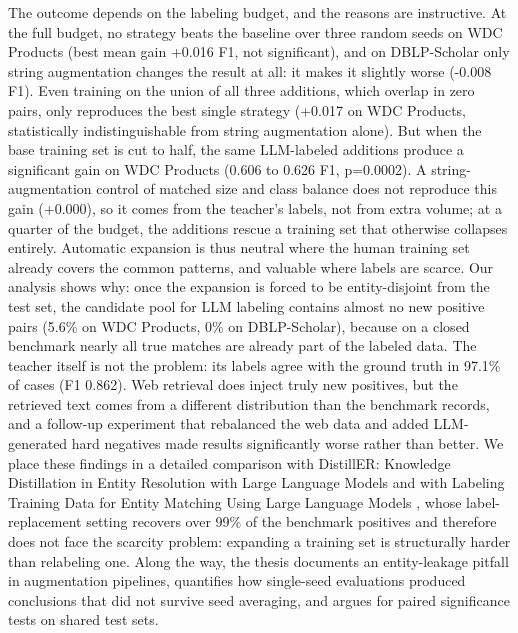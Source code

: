 \documentclass[a4paper,oneside,bibliography=totoc]{scrbook}
\begin{document}
The outcome depends on the labeling budget, and the reasons are instructive. At the full budget, no strategy beats the baseline over three random seeds on WDC Products (best mean gain +0.016 F1, not significant), and on DBLP-Scholar only string augmentation changes the result at all: it makes it slightly worse (-0.008 F1). Even training on the union of all three additions, which overlap in zero pairs, only reproduces the best single strategy (+0.017 on WDC Products, statistically indistinguishable from string augmentation alone). But when the base training set is cut to half, the same LLM-labeled additions produce a significant gain on WDC Products (0.606 to 0.626 F1, p=0.0002). A string-augmentation control of matched size and class balance does not reproduce this gain (+0.000), so it comes from the teacher's labels, not from extra volume; at a quarter of the budget, the additions rescue a training set that otherwise collapses entirely. Automatic expansion is thus neutral where the human training set already covers the common patterns, and valuable where labels are scarce. Our analysis shows why: once the expansion is forced to be entity-disjoint from the test set, the candidate pool for LLM labeling contains almost no new positive pairs (5.6\% on WDC Products, 0\% on DBLP-Scholar), because on a closed benchmark nearly all true matches are already part of the labeled data. The teacher itself is not the problem: its labels agree with the ground truth in 97.1\% of cases (F1 0.862). Web retrieval does inject truly new positives, but the retrieved text comes from a different distribution than the benchmark records, and a follow-up experiment that rebalanced the web data and added LLM-generated hard negatives made results significantly worse rather than better. We place these findings in a detailed comparison with DistillER: Knowledge Distillation in Entity Resolution with Large Language Models  \cite{zeakis2026distiller} and with Labeling Training Data for Entity Matching Using Large Language Models \cite{steiner2026labeling}, whose label-replacement setting recovers over 99\% of the benchmark positives and therefore does not face the scarcity problem: expanding a training set is structurally harder than relabeling one. Along the way, the thesis documents an entity-leakage pitfall in augmentation pipelines, quantifies how single-seed evaluations produced conclusions that did not survive seed averaging, and argues for paired significance tests on shared test sets.

\begingroup%
\hypersetup{hidelinks}%
\tableofcontents%
\endgroup
\end{document}
